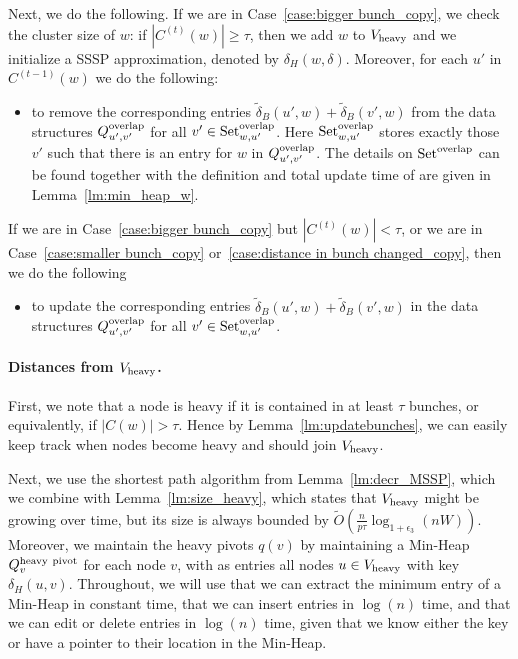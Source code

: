     Next, we do the following. 
    If we are in Case~\ref{case:bigger bunch_copy}, we check the cluster size of $w$: if $|C^{(t)}(w)|\geq\tau$, then we add $w$ to $V_{\rm{heavy}}$ and we initialize a SSSP approximation, denoted by $\delta_H(w,\delta)$. Moreover, for each $u'$ in $C^{(t-1)}(w)$ we do the following:
\begin{itemize}
    \item {} to remove the corresponding entries $\tilde\delta_B(u',w)+\tilde\delta_B(v',w)$ from the data structures $Q^{\rm{overlap}}_{u',v'}$ for all $v'\in \text{Set}^{\rm{overlap}}_{w,u'}$. Here $\text{Set}^{\rm{overlap}}_{w,u'}$ stores exactly those $v'$ such that there is an entry for $w$ in $Q^{\rm{overlap}}_{u',v'}$. The details on $\text{Set}^{\rm{overlap}}$ can be found together with the definition and total update time of \UpdateOverlapDS are given in Lemma~\ref{lm:min_heap_w}.
\end{itemize}

If we are in Case~\ref{case:bigger bunch_copy} but $|C^{(t)}(w)|<\tau$, or we are in Case~\ref{case:smaller bunch_copy} or~\ref{case:distance in bunch changed_copy}, then we do the following
\begin{itemize}
    \item {} to update the corresponding entries $\tilde\delta_B(u',w)+\tilde\delta_B(v',w)$ in the data structures $Q^{\rm{overlap}}_{u',v'}$ for all $v'\in \text{Set}^{\rm{overlap}}_{w,u'}$. 
\end{itemize}


\paragraph{Distances from $ V_{\rm{heavy}} $.}
First, we note that a node is heavy if it is contained in at least $\tau$ bunches, or equivalently, if $|C(w)|>\tau$. Hence by Lemma~\ref{lm:updatebunches}, we can easily keep track when nodes become heavy and should join $V_{\rm{heavy}}$. 

Next, we use the shortest path algorithm from Lemma~\ref{lm:decr_MSSP}, which we combine with Lemma~\ref{lm:size_heavy}, which states that $V_{\rm{heavy}}$ might be growing over time, but its size is always bounded by $ \tilde O (\tfrac{n }{p\tau}\log_{1+\epsilon_3}(nW)) $. 
Moreover, we maintain the heavy pivots $q(v)$ by maintaining a Min-Heap $Q^{\rm{heavy~pivot}}_v$ for each node $v$, with as entries all nodes $u\in V_{\rm{heavy}}$ with key $\delta_H(u,v)$. Throughout, we will use that we can extract the minimum entry of a Min-Heap in constant time, that we can insert entries in $\log(n)$ time, and that we can edit or delete entries in $\log(n)$ time, given that we know either the key or have a pointer to their location in the Min-Heap. 

